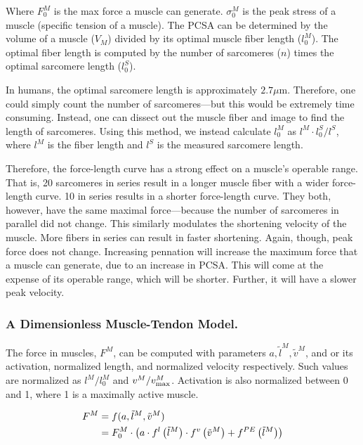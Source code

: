 Where $F_0^M$ is the max force a muscle can generate. $\sigma_0^M$ is the peak stress of a muscle (specific tension of a muscle). The PCSA can be determined by the volume of a muscle ($V_M$) divided by its optimal muscle fiber length ($l_0^M$). The optimal fiber length is computed by the number of sarcomeres ($n$) times the optimal sarcomere length ($l^S_0$).\newline

In humans, the optimal sarcomere length is approximately $2.7\mu$m. Therefore, one could simply count the number of sarcomeres---but this would be extremely time consuming. Instead, one can dissect out the muscle fiber and image to find the length of sarcomeres. Using this method, we instead calculate $l_0^M$ as $l^M \cdot l^S_0 / l^S$, where $l^M$ is the fiber length and $l^S$ is the measured sarcomere length.\newline

Therefore, the force-length curve has a strong effect on a muscle's operable range. That is, 20 sarcomeres in series result in a longer muscle fiber with a wider force-length curve. 10 in series results in a shorter force-length curve. They both, however, have the same maximal force---because the number of sarcomeres in parallel did not change. This similarly modulates the shortening velocity of the muscle. More fibers in series can result in faster shortening. Again, though, peak force does not change. Increasing pennation will increase the maximum force that a muscle can generate, due to an increase in PCSA. This will come at the expense of its operable range, which will be shorter. Further, it will have a slower peak velocity. 


\subsubsection{A Dimensionless Muscle-Tendon Model.}

The force in muscles, $F^M$, can be computed with parameters $a, \tilde{l}^M, \tilde{v}^M$, and or its activation, normalized length, and normalized velocity respectively. Such values are normalized as $l^M / l_0^M$ and $v^M / v^M_{\rm max}$. Activation is also normalized between 0 and 1, where 1 is a maximally active muscle. 

\begin{equation}
\begin{split}
    F^M &= f(a, \tilde{l}^M, \tilde{v}^M) \\
    &= F_0^M \cdot \left(a \cdot f^l\left(\tilde{l}^M\right) \cdot f^v\left(\tilde{v}^M\right) + f^{PE}\left(\tilde{l}^M\right)\right) \\
\end{split}
\end{equation}

